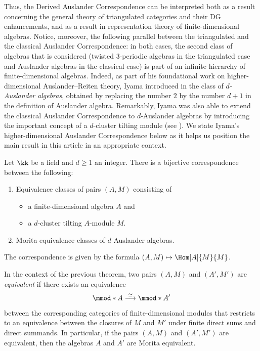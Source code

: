 \documentclass[a4paper]{amsart}
\begin{document}
Thus, the Derived Auslander Correspondence can be interpreted both as a
result concerning the general theory of triangulated categories and their DG
enhancements, and as a result in representation theory of finite-dimensional
algebras. Notice, moreover, the following parallel between the triangulated and
the classical Auslander Correspondence: in both cases, the second class of
algebras that is considered (twisted $3$-periodic algebras in the triangulated
case and Auslander algebras in the classical case) is part of an infinite
hierarchy of finite-dimensional algebras. Indeed, as part of his foundational
work on higher-dimensional Auslander--Reiten theory, Iyama introduced in
\cite{Iya07a} the class of \emph{$d$-Auslander algebras}, obtained by replacing
the number $2$ by the number $d+1$ in the definition of Auslander algebra.
Remarkably, Iyama was also able to extend the classical Auslander Correspondence
to $d$-Auslander algebras by introducing the important concept of a $d$-cluster
tilting module \cite{Iya07} (see ). We state Iyama's
higher-dimensional Auslander Correspondence below as it helps us position the
main result in this article in an appropriate context.

\begin{theorem*}
  Let $\kk$ be a field and $d\geq1$ an integer. There is a bijective
  correspondence between the following:
  \begin{enumerate}
  \item Equivalence classes of pairs $(A,M)$ consisting of
    \begin{itemize}
    \item a finite-dimensional algebra $A$ and
    \item a $d$-cluster tilting $A$-module $M$.
    \end{itemize}
  \item Morita equivalence classes of $d$-Auslander algebras.
  \end{enumerate}
  The correspondence is given by the formula $(A,M)\mapsto\Hom[A]{M}{M}$.
\end{theorem*}

In the context of the previous theorem, two pairs $(A,M)$ and $(A',M')$ are
\emph{equivalent} if there exists an equivalence
\[
  \mmod*{A}\stackrel{\simeq}{\longrightarrow}\mmod*{A'}
\]
between the corresponding categories of finite-dimensional modules that
restricts to an equivalence between the closures of $M$ and $M'$ under finite
direct sums and direct summands. In particular, if the pairs $(A,M)$ and
$(A',M')$ are equivalent, then the algebras $A$ and $A'$ are Morita equivalent.
\end{document}
